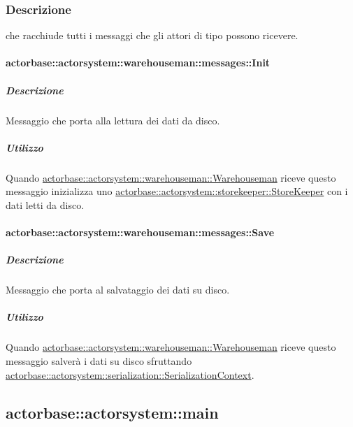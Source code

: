 \documentclass{scalatekids-article}
\begin{document}
\subsubsection{Descrizione}

 che racchiude tutti i messaggi che gli attori di tipo
 possono ricevere.

\paragraph{actorbase::actorsystem::warehouseman::messages::Init}
\label{sec:actorbase::actorsystem::warehouseman::messages::Init}

\subparagraph{Descrizione}

Messaggio che porta alla lettura dei dati da disco.

\subparagraph{Utilizzo}

Quando \hyperref[sec:actorbase::actorsystem::warehouseman::Warehouseman]{actorbase::actorsystem::warehouseman::Warehouseman}
riceve questo messaggio inizializza uno \hyperref[sec:actorbase::actorsystem::storekeeper::StoreKeeper]{actorbase::actorsystem::storekeeper::StoreKeeper}
con i dati letti da disco.

\paragraph{actorbase::actorsystem::warehouseman::messages::Save}
\label{sec:actorbase::actorsystem::warehouseman::messages::Save}

\subparagraph{Descrizione}

Messaggio che porta al salvataggio dei dati su disco.

\subparagraph{Utilizzo}

Quando \hyperref[sec:actorbase::actorsystem::warehouseman::Warehouseman]{actorbase::actorsystem::warehouseman::Warehouseman}
riceve questo messaggio salverà i dati su disco sfruttando
\hyperref[sec:actorbase::actorsystem::serialization::SerializationContext]{actorbase::actorsystem::serialization::SerializationContext}.


\subsection{actorbase::actorsystem::main} %
\label{sec:actorbase::actorsystem::main}
\end{document}
